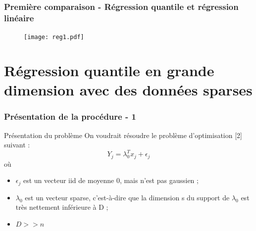\documentclass[unknownkeysallowed]{beamer}
\begin{document}
\begin{frame}
\frametitle{Première comparaison - Régression quantile et régression linéaire}
\begin{figure}[!h]
    \begin{center}
   \texttt{[image: reg1.pdf]}
   \end{center}
    \end{figure}
\end{frame}



\section{Régression quantile en grande dimension avec des données sparses}

\begin{frame}
\frametitle{Présentation de la procédure - 1}
\begin{block}{Présentation du problème}
On voudrait résoudre le problème d'optimisation [2] suivant :
$$Y_j = \lambda_0^T x_j + \epsilon_j$$
où 
\begin{itemize}
    \item $\epsilon_j$ est un vecteur iid de moyenne $0$, mais n'est pas gaussien ;
    \item $\lambda_0$ est un vecteur sparse, c'est-à-dire que la dimension s du support de $\lambda_0$ est très nettement inférieure à D ;
    \item $D >> n$
\end{itemize}
\end{block}

\end{frame}
\end{document}
